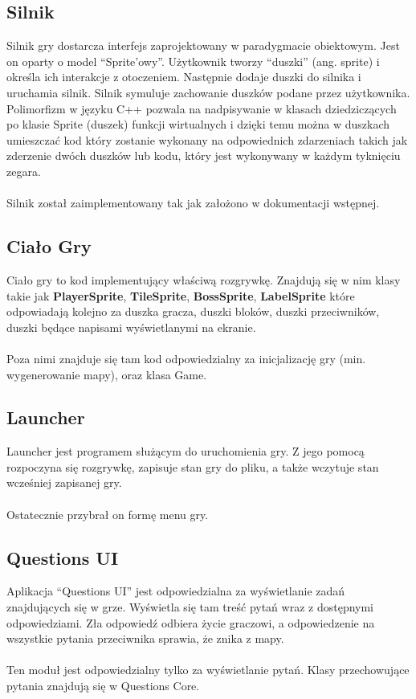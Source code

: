 \documentclass[12pt, titlepage]{article}
\begin{document}
\subsection{Silnik}
Silnik gry dostarcza interfejs zaprojektowany w
paradygmacie obiektowym. Jest on oparty o model
"`Sprite'owy"'. Użytkownik tworzy "`duszki"' (ang.
sprite) i określa ich interakcje z otoczeniem.
Następnie dodaje duszki do silnika i uruchamia
silnik. Silnik symuluje zachowanie duszków
podane przez użytkownika. Polimorfizm w języku C++
pozwala na
nadpisywanie w klasach dziedziczących po klasie
Sprite (duszek) funkcji wirtualnych i dzięki temu
można w duszkach umieszczać kod który zostanie
wykonany na odpowiednich zdarzeniach takich jak
zderzenie dwóch duszków lub kodu, który jest
wykonywany w każdym tyknięciu zegara.
\\~\\
Silnik został zaimplementowany tak jak założono
w dokumentacji wstępnej.

\subsection{Ciało Gry}
Ciało gry to kod implementujący właściwą
rozgrywkę. Znajdują się w nim klasy takie
jak \textbf{PlayerSprite}, \textbf{TileSprite},
\textbf{BossSprite}, \textbf{LabelSprite}
które odpowiadają kolejno
za duszka gracza, duszki bloków,
duszki przeciwników, duszki będące napisami
wyświetlanymi na ekranie.
\\~\\
Poza nimi znajduje się tam kod odpowiedzialny
za inicjalizację gry (min. wygenerowanie mapy),
oraz klasa Game.

\subsection{Launcher}
Launcher jest programem
służącym do uruchomienia gry.
Z jego pomocą rozpoczyna się
rozgrywkę, zapisuje stan gry
do pliku, a także wczytuje stan 
wcześniej zapisanej gry.
\\~\\
Ostatecznie przybrał on formę
menu gry.

\subsection{Questions UI}
Aplikacja "`Questions UI"'
jest odpowiedzialna za
wyświetlanie zadań znajdujących
się w grze.
Wyświetla się tam treść pytań
wraz z dostępnymi odpowiedziami.
Zła odpowiedź odbiera
życie graczowi, a odpowiedzenie
na wszystkie pytania przeciwnika
sprawia, że znika z mapy.
\\~\\
Ten moduł jest odpowiedzialny
tylko za wyświetlanie pytań.
Klasy przechowujące pytania znajdują
się w Questions Core.
\end{document}
